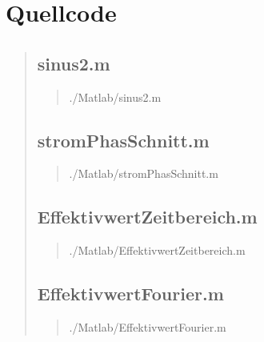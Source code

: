 \section{Quellcode}
\begin{quote}
    \subsection{sinus2.m}
    \begin{quote}
        
            {./Matlab/sinus2.m}
    \end{quote}
    \subsection{stromPhasSchnitt.m}
    \begin{quote}
        
            {./Matlab/stromPhasSchnitt.m}
    \end{quote}
    \subsection{EffektivwertZeitbereich.m}
    \begin{quote}
        
            {./Matlab/EffektivwertZeitbereich.m}
    \end{quote}
    \subsection{EffektivwertFourier.m}
    \begin{quote}
        
            {./Matlab/EffektivwertFourier.m}
    \end{quote}
	
\end{quote}



\begin{thebibliography}{999}

\end{thebibliography}





